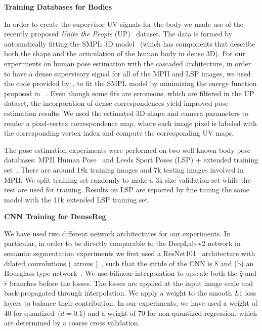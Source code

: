  \textbf{Training Databases for Bodies}
 
 In order to create the supervisor UV signals for the body we made use of the recently proposed \textit{Unite the People} (UP)~\cite{lassner2017unite} dataset. The data is formed by automatically fitting the SMPL 3D model~\cite{loper2015smpl} (which has components that describe both the shape and the articulation of the human body in dense 3D). 
 For our experiments on human pose estimation with the cascaded architecture, in order to have a dense supervisory signal for all of the MPII and LSP images, we used the code provided by~\cite{lassner2017unite}, to fit the SMPL model by minimizing the energy function proposed in ~\cite{bogo2016keep}. Even though some fits are erroneous, which are filtered in the UP dataset, the incorporation of dense correspondences yield improved pose estimation results. We used the estimated 3D shape and camera parameters to render a pixel-vertex correspondence map, where each image pixel is labeled with the corresponding vertex index and compute the corresponding UV maps. 
 
 The pose estimation experiments were performed on two well known body pose databases: MPII Human Pose~\cite{andriluka20142d} and Leeds Sport Poses (LSP) + extended training set~\cite{Johnson10}. There are around 18k training images and 7k testing images involved in MPII. We split training set randomly to make a 3k size validation set while the rest are used for training. Results on LSP are reported by fine tuning the same model with the 11k extended LSP training set.

\textbf{CNN Training for DenseReg} 

We have used two different network architectures for our experiments. In particular, in order to be directly comparable to the DeepLab-v2 network in semantic segmentation experiments we first used a ResNet101~\cite{He2015} architecture with dilated convolutions ( atrous )~\cite{CP2015Semantic,mallat1999wavelet}, such that the stride of the CNN is $8$ and (b) an Hourglass-type network~\cite{newell2016stacked}. We use bilinear interpolation to upscale both the $\hat{q}$ and $\hat{r}$ branches before the losses. The losses are applied at the input image scale and back-propagated through interpolation. We apply a weight to the smooth $L1$ loss layers to balance their contribution. In our experiments, we have used a weight of $40$ for quantized~($d=0.1$) and a weight of $70$ for non-quantized regression, which are determined by a coarse cross validation. 

